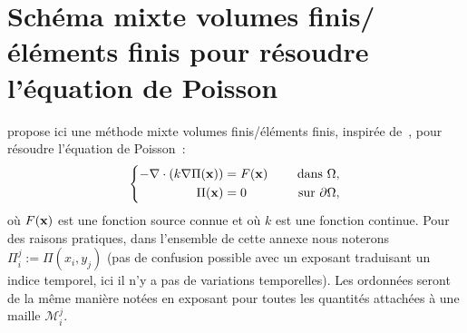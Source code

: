 \documentclass[main.tex]{subfiles}
\begin{document}
\chapter{\label{chap:anx_methode_mixte_VFEF}Schéma mixte volumes finis/éléments finis pour résoudre l'équation de Poisson}

\allowdisplaybreaks[1]
 propose ici une méthode mixte volumes finis/éléments finis, inspirée de~\cite{latige2013second}, pour résoudre l'équation de Poisson~:
\begin{equation}\label{eq:anx_poisson}
\left\{
\begin{aligned}
-\nabla\cdot ( k \nabla \Pi(\mathbf{x}) ) &= F(\mathbf{x}) & \quad \textrm{ dans }  \Omega , \\
\Pi(\mathbf{x}) &=0 & \quad \textrm{ sur  } \partial \Omega,
\end{aligned}
\right.
\end{equation}
où $F(\mathbf{x})$ est une fonction source connue et où $k$ est une fonction continue. Pour des raisons pratiques, dans l'ensemble de cette annexe nous noterons $\Pi_i^j := \Pi(x_i,y_j)$ (pas de confusion possible avec un exposant traduisant un indice temporel, ici il n'y a pas de variations temporelles). Les ordonnées seront de la même manière notées en exposant pour toutes les quantités attachées à une maille $\mathcal{M}_i^j$.
\end{document}
